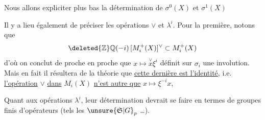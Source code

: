 Nous allons expliciter plus bas la détermination de $\sigma^0(X)$ et $\sigma^1(X)$

Il y a lieu également de préciser les opérations $\vee$ et $\lambda^i$. Pour la première, notons que
\[
\deleted{\mathbb Z}\mathbb Q(-i)\,[M_i^+(X)]^\vee\subset M_i^+(X)
\]
d'où on conclut de proche en proche que $x\mapsto\overset{\vee}{x}\xi^i$ définit sur $\sigma_i$ une involution. Mais en fait il résultera de la théorie  que \uline{cette dernière est l'identité}, i.e. \uline{l'opération} $\vee$ \uline{dans}  $M_i(X)$  \uline{n'est autre que} $x\mapsto\xi^{-i}x$, 

Quant aux opérations $\lambda^i$, leur détermination devrait se faire en termes de groupes finis d'opérateurs (tels les $\unsure{\mathfrak S|G}_p$ \dots).
